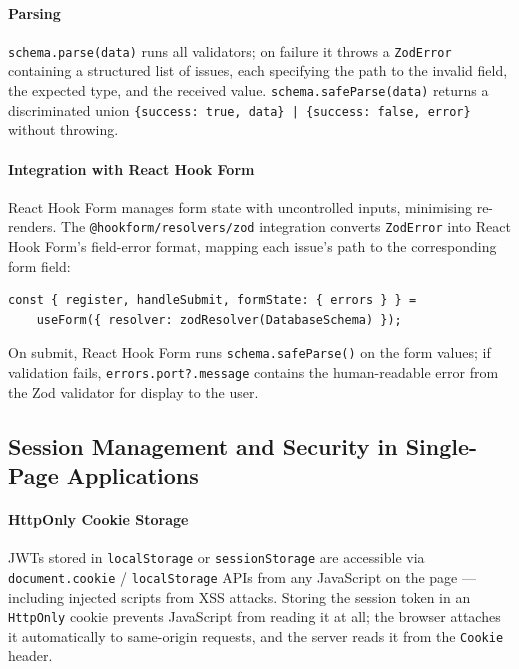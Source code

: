 \paragraph{Parsing}

\texttt{schema.parse(data)} runs all validators; on failure it throws a \texttt{ZodError} containing a structured list of issues, each specifying the path to the invalid field, the expected type, and the received value. \texttt{schema.safeParse(data)} returns a discriminated union \texttt{\{success: true, data\} | \{success: false, error\}} without throwing.

\paragraph{Integration with React Hook Form}

React Hook Form manages form state with uncontrolled inputs, minimising re-renders. The \texttt{@hookform/resolvers/zod} integration converts \texttt{ZodError} into React Hook Form's field-error format, mapping each issue's path to the corresponding form field:
\begin{verbatim}
const { register, handleSubmit, formState: { errors } } =
    useForm({ resolver: zodResolver(DatabaseSchema) });
\end{verbatim}
On submit, React Hook Form runs \texttt{schema.safeParse()} on the form values; if validation fails, \texttt{errors.port?.message} contains the human-readable error from the Zod validator for display to the user.

\subsection{Session Management and Security in Single-Page Applications}

\paragraph{HttpOnly Cookie Storage}

JWTs stored in \texttt{localStorage} or \texttt{sessionStorage} are accessible via \texttt{document.cookie} / \texttt{localStorage} APIs from any JavaScript on the page — including injected scripts from XSS attacks. Storing the session token in an \texttt{HttpOnly} cookie prevents JavaScript from reading it at all; the browser attaches it automatically to same-origin requests, and the server reads it from the \texttt{Cookie} header.

